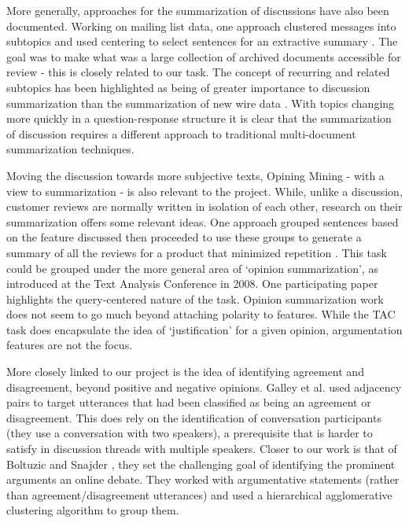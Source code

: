     More generally, approaches for the summarization of discussions have also been documented. Working on mailing list data, one approach clustered messages into subtopics and used centering to select sentences for an extractive summary \cite{newman2003summarizing}. The goal was to make what was a large collection of archived documents accessible for review - this is closely related to our task. The concept of recurring and related subtopics has been highlighted as being of greater importance to discussion summarization than the summarization of new wire data \cite{zhou2006summarization}. With topics changing more quickly in a question-response structure it is clear that the summarization of discussion requires a different approach to traditional multi-document summarization techniques.

    Moving the discussion towards more subjective texts, Opining Mining - with a view to summarization - is also relevant to the project. While, unlike a discussion, customer reviews are normally written in isolation of each other, research on their summarization offers some relevant ideas. One approach grouped sentences based on the feature discussed then proceeded to use these groups to generate a summary of all the reviews for a product that minimized repetition \cite{hu2004mining}. This task could be grouped under the more general area of `opinion summarization', as introduced at the Text Analysis Conference in 2008. One participating paper \cite{lloret2009towards} highlights the query-centered nature of the task. Opinion summarization work does not seem to go much beyond attaching polarity to features. While the TAC task does encapsulate the idea of `justification' for a given opinion, argumentation features are not the focus.

    More closely linked to our project is the idea of identifying agreement and disagreement, beyond positive and negative opinions. Galley et al. \cite{galley2004identifying} used adjacency pairs to target utterances that had been classified as being an agreement or disagreement. This does rely on the identification of conversation participants (they use a conversation with two speakers), a prerequisite that is harder to satisfy in discussion threads with multiple speakers. Closer to our work is that of Boltuzic and Snajder \cite{boltuzic2015identifying}, they set the challenging goal of identifying the prominent arguments an online debate. They worked with argumentative statements (rather than agreement/disagreement utterances) and used a hierarchical agglomerative clustering algorithm to group them.

